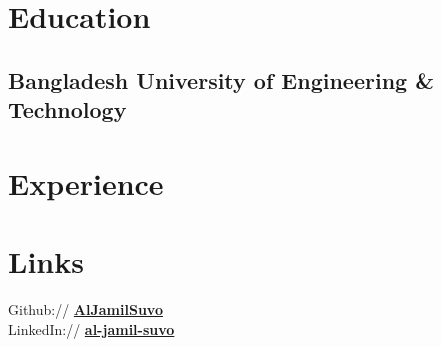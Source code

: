 \documentclass[]{al-jamil-suvo-resume-openfont}
\begin{document}
%
%
\lastupdated

%
%

%
%

\begin{minipage}[t]{0.33\textwidth} 


\section{Education} 

\subsection{Bangladesh University of Engineering \& Technology}
\sectionsep

\section{Experience}
\sectionsep



\section{Links} 
Github:// \href{https://github.com/AlJamilSuvo}{\bf AlJamilSuvo} \\
LinkedIn://  \href{https://www.linkedin.com/in/al-jamil-suvo/}{\bf al-jamil-suvo} \\






\end{minipage}
\end{document}
